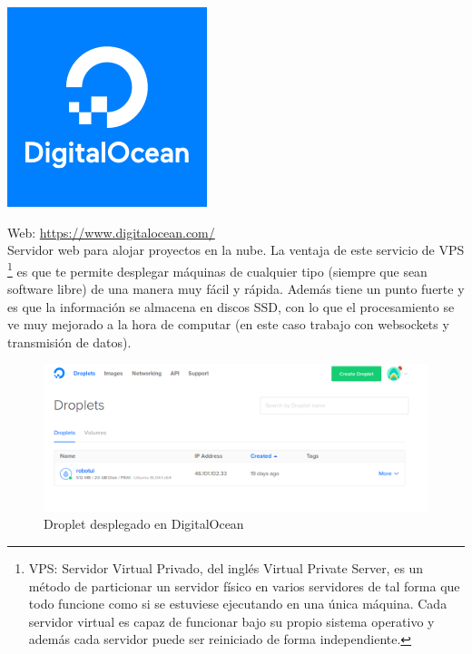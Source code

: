 \begin{center}\includegraphics[scale=0.35]{imagenes/docean-logo.png}\end{center}

Web: \url{https://www.digitalocean.com/}\\

Servidor web para alojar proyectos en la nube. La ventaja de este servicio de VPS \footnote{ VPS: Servidor Virtual Privado, del inglés Virtual Private Server, es un método de particionar un servidor
físico en varios servidores de tal forma que todo funcione como si se estuviese ejecutando en una única máquina. Cada servidor virtual es capaz de funcionar bajo su propio sistema operativo y
además cada servidor puede ser reiniciado de forma independiente.} es que te permite desplegar máquinas de cualquier tipo (siempre que sean software libre) de una manera muy fácil y rápida. 
Además tiene un punto fuerte y es que la información se almacena en discos SSD, con lo que el procesamiento se ve muy mejorado a la hora de computar (en este caso trabajo con websockets y 
transmisión de datos).\\

\begin{figure}[H]
\begin{center}
\includegraphics[scale=0.45]{imagenes/droplets.png}
\caption{Droplet desplegado en DigitalOcean}
\end{center}
\end{figure}


